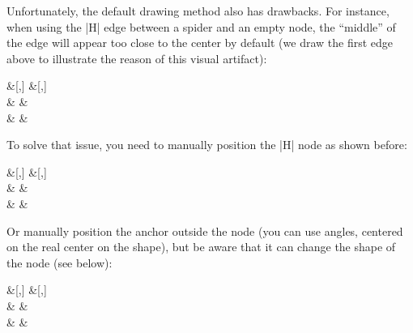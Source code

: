 \documentclass[a4paper]{ltxdoc}
\begin{document}
{Unfortunately, the default drawing method also has drawbacks. For instance, when using the |H| edge between a spider and an empty node, the ``middle'' of the edge will appear too close to the center by default (we draw the first edge above to illustrate the reason of this visual artifact):
\begin{codeexample}[width=0cm]
\begin{ZX}
 \zxN{}  &[\zxwCol,\zxHCol]  &[\zxwCol,\zxHCol] \zxN{} \\[\zxNRow]%
                                 & \zxX{\alpha}
                                   \ar[ru,N'-,H]
                                   \ar[rd,N.-,H] &  \\[\zxNRow]
 \zxN{} \ar[ru,-N',H]                        &  & \zxN{}
\end{ZX}
\end{codeexample}
To solve that issue, you need to manually position the |H| node as shown before:
\begin{codeexample}[width=0cm]
\begin{ZX}
 \zxN{} \ar[rd,edge above,-N.,H={pos=.35}] &[\zxwCol,\zxHCol]  &[\zxwCol,\zxHCol] \zxN{} \\[\zxNRow]%
                                           & \zxX{\alpha}
                                             \ar[ru,N'-,H={pos=1-.35}]
                                             \ar[rd,N.-,H={pos=1-.35}] &  \\[\zxNRow]
 \zxN{} \ar[ru,-N',H={pos=.35}]                                  &  & \zxN{}
\end{ZX}
\end{codeexample}
Or manually position the anchor outside the node (you can use angles, centered on the real center on the shape), but be aware that it can change the shape of the node (see below):
\begin{codeexample}[width=0cm]
\begin{ZX}
 \zxN{} \ar[rd,edge above,-N.,H,end anchor=180-45] &[\zxwCol,\zxHCol]  &[\zxwCol,\zxHCol] \zxN{} \\[\zxNRow]%
                                           & \zxX{\alpha}
                                             \ar[ru,N'-,H,start anchor=45]
                                             \ar[rd,N.-,H,start anchor=-45] &  \\[\zxNRow]
 \zxN{} \ar[ru,-N',H,end anchor=180+45]                                  &  & \zxN{}
\end{ZX}
\end{codeexample}

}
\end{document}
